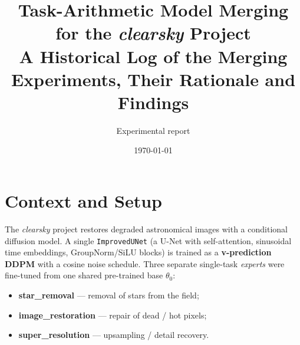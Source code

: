 
\titleformat{\section}{\Large\bfseries\color{headblue}}{\thesection}{0.6em}{}
\titleformat{\subsection}{\large\bfseries\color{headblue}}{\thesubsection}{0.6em}{}

\newcommand{\code}[1]{\texttt{\small #1}}
\newcommand{\lam}[3]{$\lambda_{\mathrm{SR}}{=}#1,\ \lambda_{\mathrm{IR}}{=}#2,\ \lambda_{\mathrm{SU}}{=}#3$}

\captionsetup{font=small,labelfont=bf}

\title{\vspace{-1.2cm}\textbf{Task-Arithmetic Model Merging for the \emph{clearsky} Project}\\[4pt]
\large A Historical Log of the Merging Experiments, Their Rationale and Findings}
\author{Experimental report}
\date{\today}


\maketitle
\vspace{-0.6cm}

\section{Context and Setup}

The \emph{clearsky} project restores degraded astronomical images with a
conditional diffusion model. A single \code{ImprovedUNet} (a U-Net with
self-attention, sinusoidal time embeddings, GroupNorm/SiLU blocks) is trained as a
\textbf{v-prediction DDPM} with a cosine noise schedule. Three separate
single-task \emph{experts} were fine-tuned from one shared pre-trained
base $\theta_0$:

\begin{itemize}[nosep,leftmargin=1.4em]
   \item \textbf{star\_removal} --- removal of stars from the field;
   \item \textbf{image\_restoration} --- repair of dead / hot pixels;
   \item \textbf{super\_resolution} --- upsampling / detail recovery.
\end{itemize}

